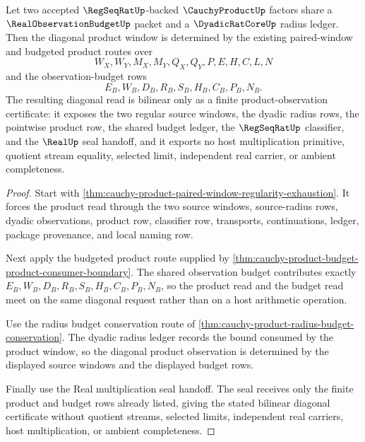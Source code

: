 \begin{theorem}
\label{thm:cauchy-product-budgeted-bilinear-diagonal}
Let two accepted $\RegSeqRatUp$-backed $\CauchyProductUp$ factors share a $\RealObservationBudgetUp$ packet and a $\DyadicRatCoreUp$ radius ledger. Then the diagonal product window is determined by the existing paired-window and budgeted product routes over
$$
W_X,W_Y,M_X,M_Y,Q_X,Q_Y,P,E,H,C,L,N
$$
and the observation-budget rows
$$
E_B,W_B,D_B,R_B,S_B,H_B,C_B,P_B,N_B.
$$
The resulting diagonal read is bilinear only as a finite product-observation certificate: it exposes the two regular source windows, the dyadic radius rows, the pointwise product row, the shared budget ledger, the $\RegSeqRatUp$ classifier, and the $\RealUp$ seal handoff, and it exports no host multiplication primitive, quotient stream equality, selected limit, independent real carrier, or ambient completeness.
\end{theorem}
\begin{proof}
Start with \autoref{thm:cauchy-product-paired-window-regularity-exhaustion}. It forces the product read through the two source windows, source-radius rows, dyadic observations, product row, classifier row, transports, continuations, ledger, package provenance, and local naming row.

Next apply the budgeted product route supplied by \autoref{thm:cauchy-product-budget-product-consumer-boundary}. The shared observation budget contributes exactly $E_B,W_B,D_B,R_B,S_B,H_B,C_B,P_B,N_B$, so the product read and the budget read meet on the same diagonal request rather than on a host arithmetic operation.

Use the radius budget conservation route of \autoref{thm:cauchy-product-radius-budget-conservation}. The dyadic radius ledger records the bound consumed by the product window, so the diagonal product observation is determined by the displayed source windows and the displayed budget rows.

Finally use the Real multiplication seal handoff. The seal receives only the finite product and budget rows already listed, giving the stated bilinear diagonal certificate without quotient streams, selected limits, independent real carriers, host multiplication, or ambient completeness.
\end{proof}


